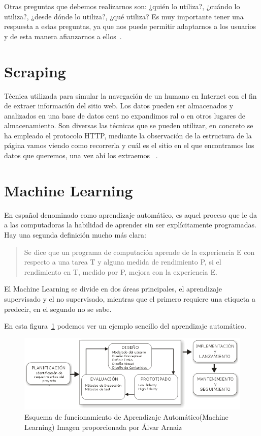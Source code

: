 Otras preguntas que debemos realizarnos son: ¿quién lo utiliza?, ¿cuándo lo utiliza?, ¿desde dónde lo utiliza?, ¿qué utiliza?
Es muy importante tener una respuesta a estas preguntas, ya que nos puede permitir adaptarnos a los usuarios y de esta manera afianzarnos a ellos~\cite{diseno_centrado_usuario_2016}.

\section{Scraping}
Técnica utilizada para simular  la navegación de un humano en Internet con el fin de extraer información del sitio web. Los datos pueden ser almacenados y analizados en una base de datos cent no expandimos ral o en otros lugares de almacenamiento.  Son diversas las técnicas que se pueden utilizar, en concreto se ha empleado el protocolo HTTP, mediante la observación de la estructura de la página vamos viendo como recorrerla y cuál es el sitio en el que encontramos los datos que queremos, una vez ahí los extraemos ~\cite{wiki:scraping}.

\section{Machine Learning}
En español denominado como aprendizaje automático, es aquel proceso que le da a las computadoras la habilidad de aprender sin ser explícitamente programadas. Hay una segunda definición mucho más clara:

\begin{quote}
Se dice que un programa de computación aprende de la experiencia E con respecto a una tarea T y alguna medida de rendimiento P, si el rendimiento en T, medido por P, mejora con la experiencia E.
\end{quote}

El Machine Learning se divide en dos áreas principales, el aprendizaje supervisado y el no supervisado, mientras que el primero requiere una etiqueta a predecir, en el segundo no se sabe.~\cite{wiki:machine_learning}

En esta figura~\ref{fig:EjMachLear} podemos ver un ejemplo sencillo del aprendizaje automático.

\begin{figure}
\centering
\includegraphics[width=.9\textwidth]{img/diseno_centrado_usuario}
\caption[Esquema de funcionamiento de Aprendizaje Automático]{Esquema de funcionamiento de Aprendizaje Automático(Machine Learning) Imagen proporcionada por Álvar Arnaiz}

\label{fig:EjMachLear}
\end{figure}

